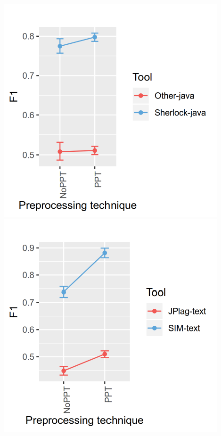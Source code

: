 \documentclass[a4paper, 12pt, oneside, openany, final, pdftex]{book}\usepackage[]{graphicx}\usepackage[]{color}
\makeatletter
\def\maxwidth{ %
  \ifdim\Gin@nat@width>\linewidth
    \linewidth
  \else
    \Gin@nat@width
  \fi
}
\makeatother
\begin{document}
\begin{appendices}
\begin{figure}[ht]
\label{fig:interaction- 2 for SOCO D1 }\endminipage\hfill {} 
\includegraphics[width=\maxwidth]{figure/Figure-SOCO-INTERACTION-3} 
\label{fig:interaction- 3 for SOCO D1 }\endminipage\hfill {} 
\includegraphics[width=\maxwidth]{figure/Figure-SOCO-INTERACTION-4} 

\end{figure}
\end{appendices}
\end{document}
